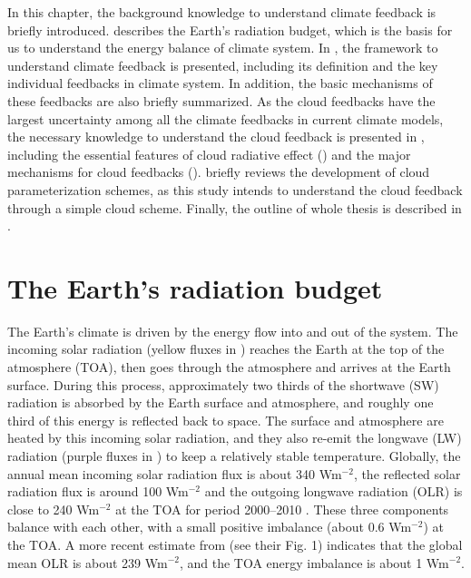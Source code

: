 In this chapter, the background knowledge to understand climate feedback is briefly introduced.  describes the Earth's radiation budget, which is the basis for us to understand the energy balance of climate system. In , the framework to understand climate feedback is presented, including its definition and the key individual feedbacks in climate system. In addition, the basic mechanisms of these feedbacks are also briefly summarized. As the cloud feedbacks have the largest uncertainty among all the climate feedbacks in current climate models, the necessary knowledge to understand the cloud feedback is presented in , including the essential features of cloud radiative effect () and the major mechanisms for cloud feedbacks ().  briefly reviews the development of cloud parameterization schemes, as this study intends to understand the cloud feedback through a simple cloud scheme. Finally, the outline of whole thesis is described in .

\section{The Earth’s radiation budget}
\label{sec:earth_rad_budget}

The Earth's climate is driven by the energy flow into and out of the system. The incoming solar radiation (yellow fluxes in ) reaches the Earth at the top of the atmosphere (TOA), then goes through the atmosphere and arrives at the Earth surface. During this process, approximately two thirds of the shortwave (SW) radiation is absorbed by the Earth surface and atmosphere, and roughly one third of this energy is reflected back to space. The surface and atmosphere are heated by this incoming solar radiation, and they also re-emit the longwave (LW) radiation (purple fluxes in ) to keep a relatively stable temperature. Globally, the annual mean incoming solar radiation flux is about 340 Wm$^{-2}$, the reflected solar radiation flux is around 100 Wm$^{-2}$ and the outgoing longwave radiation (OLR) is close to 240 Wm$^{-2}$ at the TOA for period 2000--2010 \citep{Stephens2012update}. These three components balance with each other, with a small positive imbalance (about 0.6 Wm$^{-2}$) at the TOA. A more recent estimate from \cite{Wild2015} (see their Fig. 1) indicates that the global mean OLR is about 239 Wm$^{-2}$, and the TOA energy imbalance is about 1 Wm$^{-2}$.

